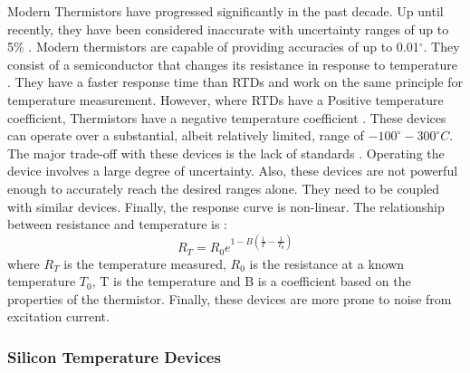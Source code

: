 Modern Thermistors have progressed significantly in the past decade. Up until recently, they have been considered inaccurate with uncertainty ranges of up to 5\% \cite{tong2001improving}. Modern thermistors are capable of providing accuracies of up to 0.01$^\circ$. They consist of a semiconductor that changes its resistance in response to temperature \cite{childs2000review}. They have a faster response time than RTDs and work on the same principle for temperature measurement. However, where RTDs have a Positive temperature coefficient, Thermistors have a negative temperature coefficient \cite{tong2001improving}. These devices can operate over a substantial, albeit relatively limited, range of $-100^\circ - 300^\circ C$. The major trade-off with these devices is the lack of standards \cite{tong2001improving}. Operating the device involves a large degree of uncertainty. Also, these devices are not powerful enough to accurately reach the desired ranges alone. They need to be coupled with similar devices. Finally, the response curve is non-linear. The  relationship between resistance and temperature is \cite{childs2000review}:
\begin{equation}
	R_T = R_0e^{1 - B(\frac{1}{T}- \frac{1}{T_0})}
\end{equation}
where $R_T$ is the temperature measured, $R_0$ is the resistance at a known temperature $T_0$, T is the temperature and B is a coefficient based on the properties of the thermistor. Finally, these devices are more prone to noise from excitation current.
\subsubsection{Silicon Temperature Devices}

